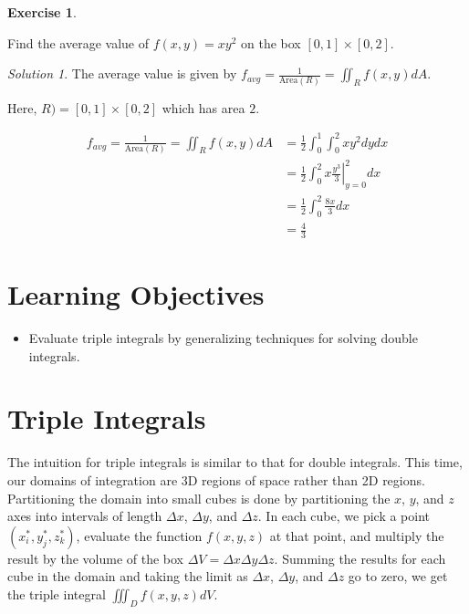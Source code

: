 \documentclass[
]{book}
\providecommand{\tightlist}{%
  \setlength{\itemsep}{0pt}\setlength{\parskip}{0pt}}
\theoremstyle{definition}
\theoremstyle{definition}
\theoremstyle{definition}
\newtheorem{exercise}{Exercise}[chapter]
\theoremstyle{definition}
\theoremstyle{remark}
\newtheorem*{solution}{Solution}
\begin{document}
\begin{exercise}
\protect\hypertarget{exr:unlabeled-div-114}{}\label{exr:unlabeled-div-114}

Find the average value of \(f(x,y)=xy^2\) on the box \([0,1]\times[0,2]\).

\end{exercise}

\begin{solution}

The average value is given by \(\displaystyle f_{avg}=\frac{1}{\mbox{Area}(R)}=\iint_R f(x,y)dA\).

Here, \(R)= [0,1]\times[0,2]\) which has area \(2\).

\begin{align*}
f_{avg}=\frac{1}{\mbox{Area}(R)}=\iint_R f(x,y)dA&=\frac{1}{2} \int_0^1 \int_0^2 xy^2 dy dx\\
&= \frac{1}{2} \left .\int_0^2 x \frac{y^3}{3} \right |_{y=0}^2 dx\\
&= \frac{1}{2} \int_0^2 \frac{8x}{3} dx \\
&= \frac{4}{3}
\end{align*}

\end{solution}

\hypertarget{learning-objectives-14}{%
\section{Learning Objectives}\label{learning-objectives-14}}

\begin{itemize}
\tightlist
\item
  Evaluate triple integrals by generalizing techniques for solving double integrals.
\end{itemize}

\hypertarget{triple-integrals}{%
\section{Triple Integrals}\label{triple-integrals}}

The intuition for triple integrals is similar to that for double integrals. This time, our domains of integration are 3D regions of space rather than 2D regions. Partitioning the domain into small cubes is done by partitioning the \(x\), \(y\), and \(z\) axes into intervals of length \(\Delta x\), \(\Delta y\), and \(\Delta z\). In each cube, we pick a point \((x_i^*, y_j^*, z_k^*)\), evaluate the function \(f(x,y,z)\) at that point, and multiply the result by the volume of the box \(\Delta V = \Delta x\Delta y\Delta z\). Summing the results for each cube in the domain and taking the limit as \(\Delta x\), \(\Delta y\), and \(\Delta z\) go to zero, we get the triple integral \(\displaystyle \iiint_D f(x,y,z) dV\).
\end{document}
